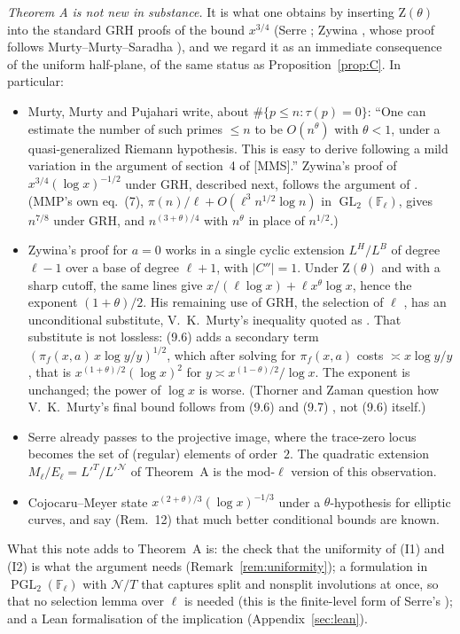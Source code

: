 \documentclass[11pt]{amsart}
\theoremstyle{definition}
\theoremstyle{remark}
\newcommand{\F}{\mathbb{F}}
\DeclareMathOperator{\GL}{GL}
\DeclareMathOperator{\PGL}{PGL}
\newcommand{\Zt}{\mathrm{Z}}       %
\newcommand{\Nor}{\mathcal{N}}     %
\begin{document}
\emph{Theorem A is not new in substance.} It is what one obtains by inserting $\Zt(\theta)$ into the standard GRH
proofs of the bound $x^{3/4}$ (Serre \cite[Cor.~2 to Thm.~15]{Serre81}; Zywina \cite[\S4, Rem.~1.5]{Zyw15},
whose proof follows Murty--Murty--Saradha \cite{MMS}), and we regard it as an immediate consequence of the uniform half-plane, of the same status as
Proposition~\ref{prop:C}. In particular:
\begin{itemize}[leftmargin=*]
\item Murty, Murty and Pujahari \cite[\S7(b), p.~12]{MMP} write, about $\#\{p\le n:\tau(p)=0\}$: ``One can estimate
  the number of such primes $\le n$ to be $O(n^\theta)$ with $\theta<1$, under a quasi-generalized Riemann hypothesis.
  This is easy to derive following a mild variation in the argument of section~4 of [MMS].'' Zywina's proof of $x^{3/4}(\log x)^{-1/2}$ under GRH, described
  next, follows the argument of \cite{MMS}. (MMP's own eq.~(7), $\pi(n)/\ell+O(\ell^3n^{1/2}\log n)$ in
  $\GL_2(\F_\ell)$, gives $n^{7/8}$ under GRH, and $n^{(3+\theta)/4}$ with $n^\theta$ in place of $n^{1/2}$.)
\item Zywina's proof for $a=0$ \cite[\S4, last paragraph]{Zyw15} works in a single cyclic extension $L^H/L^B$ of
  degree $\ell-1$ over a base of degree $\ell+1$, with $|C''|=1$. Under $\Zt(\theta)$ and with a sharp cutoff, the
  same lines give $x/(\ell\log x)+\ell x^\theta\log x$, hence the exponent $(1+\theta)/2$. His remaining use of GRH, the
  selection of $\ell$ \cite[Lemma~4.4]{MMS}, has an unconditional substitute, V.~K.~Murty's inequality quoted as
  \cite[(9.6)]{TZ}. That substitute is not lossless: (9.6) adds a secondary term
  $(\pi_f(x,a)\,x\log y/y)^{1/2}$, which after solving for $\pi_f(x,a)$ costs $\asymp x\log y/y$, that is
  $x^{(1+\theta)/2}(\log x)^2$ for $y\asymp x^{(1-\theta)/2}/\log x$. The exponent is unchanged; the power of $\log x$
  is worse. (Thorner and Zaman question how V.~K.~Murty's final bound follows from (9.6) and (9.7) \cite[\S9.1]{TZ},
  not (9.6) itself.)
\item Serre \cite[\S7.3(iii)]{Serre81} already passes to the projective image, where the trace-zero locus becomes the
  set of (regular) elements of order~$2$. The quadratic extension $M_\ell/E_\ell=L'^{T}/L'^{\Nor}$ of Theorem~A is the
  mod-$\ell$ version of this observation.
\item Cojocaru--Meyer \cite[Lemma~11, (43)]{CM} state $x^{(2+\theta)/3}(\log x)^{-1/3}$ under a $\theta$-hypothesis
  for elliptic curves, and say (Rem.~12) that much better conditional bounds are known.
\end{itemize}
What this note adds to Theorem~A is: the check that the uniformity of (I1) and (I2) is what the argument needs
(Remark~\ref{rem:uniformity}); a formulation in $\PGL_2(\F_\ell)$ with $\Nor/T$ that captures split and nonsplit
involutions at once, so that no selection lemma over $\ell$ is needed (this is the finite-level form of Serre's
\cite[\S7.3(iii)]{Serre81}); and a Lean formalisation of the implication (Appendix~\ref{sec:lean}).
\end{document}
